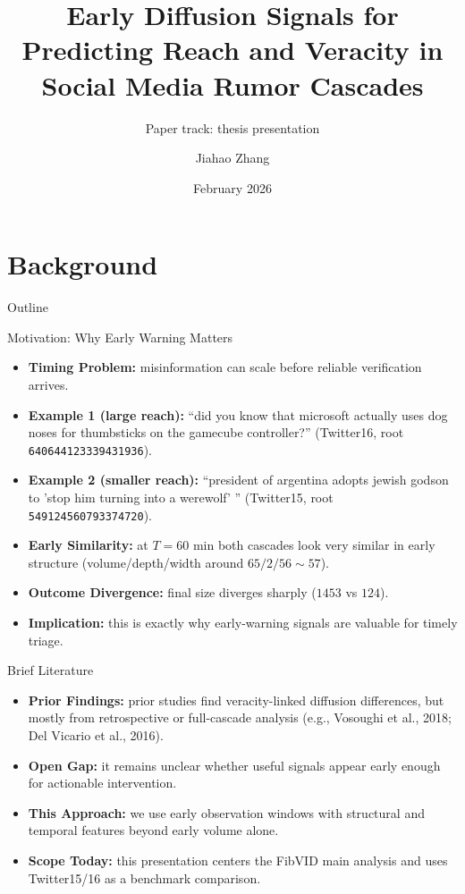 \documentclass{beamer}
\title{Early Diffusion Signals for Predicting Reach and Veracity in Social Media Rumor Cascades}
\subtitle{Paper track: thesis presentation}
\author{Jiahao Zhang}
\institute{University of Chicago}
\date{February 2026}
\begin{document}
\section{Background}
\begin{frame}
\titlepage
\end{frame}

\begin{frame}{Outline}
\tableofcontents
\end{frame}

\begin{frame}{Motivation: Why Early Warning Matters}
\begin{itemize}
\item \textbf{Timing Problem:} misinformation can scale before reliable verification arrives.
\item \textbf{Example 1 (large reach):} ``did you know that microsoft actually uses dog noses for thumbsticks on the gamecube controller?'' (Twitter16, root \texttt{640644123339431936}).
\item \textbf{Example 2 (smaller reach):} ``president of argentina adopts jewish godson to 'stop him turning into a werewolf' '' (Twitter15, root \texttt{549124560793374720}).
\item \textbf{Early Similarity:} at \(T=60\) min both cascades look very similar in early structure (volume/depth/width around \(65/2/56\sim57\)).
\item \textbf{Outcome Divergence:} final size diverges sharply (\(1453\) vs \(124\)).
\item \textbf{Implication:} this is exactly why early-warning signals are valuable for timely triage.
\end{itemize}
\end{frame}

\begin{frame}{Brief Literature}
\begin{itemize}
\item \textbf{Prior Findings:} prior studies find veracity-linked diffusion differences, but mostly from retrospective or full-cascade analysis (e.g., Vosoughi et al., 2018; Del Vicario et al., 2016).
\item \textbf{Open Gap:} it remains unclear whether useful signals appear early enough for actionable intervention.
\item \textbf{This Approach:} we use early observation windows with structural and temporal features beyond early volume alone.
\item \textbf{Scope Today:} this presentation centers the FibVID main analysis and uses Twitter15/16 as a benchmark comparison.
\end{itemize}
\end{frame}
\end{document}
